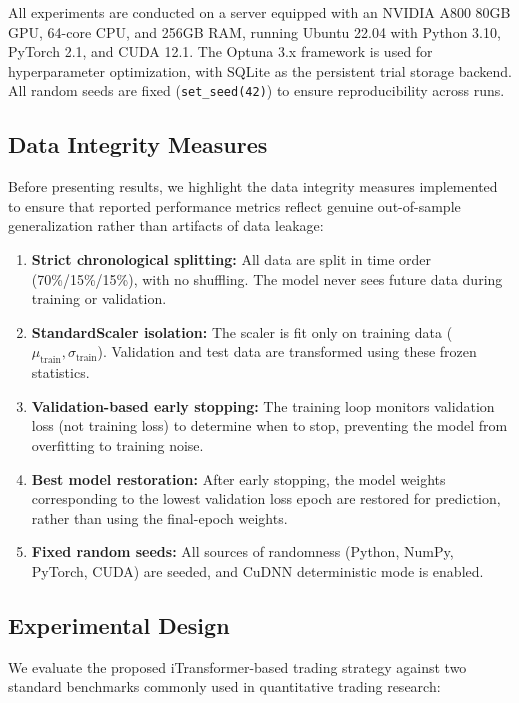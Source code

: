 \documentclass[12pt, a4paper]{article}
\begin{document}
All experiments are conducted on a server equipped with an NVIDIA A800 80GB GPU, 64-core CPU, and 256GB RAM, running Ubuntu 22.04 with Python 3.10, PyTorch 2.1, and CUDA 12.1. The Optuna 3.x framework is used for hyperparameter optimization, with SQLite as the persistent trial storage backend. All random seeds are fixed (\texttt{set\_seed(42)}) to ensure reproducibility across runs.

\subsection{Data Integrity Measures}

Before presenting results, we highlight the data integrity measures implemented to ensure that reported performance metrics reflect genuine out-of-sample generalization rather than artifacts of data leakage:

\begin{enumerate}[leftmargin=2em]
    \item \textbf{Strict chronological splitting:} All data are split in time order (70\%/15\%/15\%), with no shuffling. The model never sees future data during training or validation.
    \item \textbf{StandardScaler isolation:} The scaler is fit only on training data ($\mu_{\text{train}}, \sigma_{\text{train}}$). Validation and test data are transformed using these frozen statistics.
    \item \textbf{Validation-based early stopping:} The training loop monitors validation loss (not training loss) to determine when to stop, preventing the model from overfitting to training noise.
    \item \textbf{Best model restoration:} After early stopping, the model weights corresponding to the lowest validation loss epoch are restored for prediction, rather than using the final-epoch weights.
    \item \textbf{Fixed random seeds:} All sources of randomness (Python, NumPy, PyTorch, CUDA) are seeded, and CuDNN deterministic mode is enabled.
\end{enumerate}

\subsection{Experimental Design}

We evaluate the proposed iTransformer-based trading strategy against two standard benchmarks commonly used in quantitative trading research:
\end{document}
